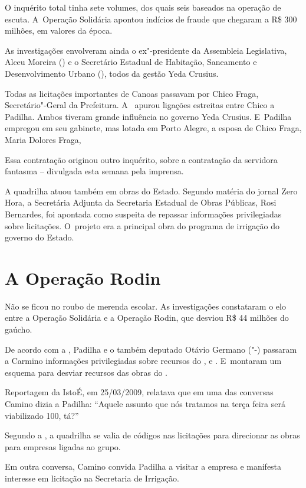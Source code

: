 O inquérito total tinha sete volumes, dos quais seis baseados na
operação de escuta. A~Operação Solidária apontou indícios de fraude que
chegaram a R\$ 300 milhões, em valores da época.

As investigações envolveram ainda o ex"-presidente da Assembleia
Legislativa, Alceu Moreira () e o Secretário Estadual de Habitação,
Saneamento e Desenvolvimento Urbano (), todos da gestão Yeda
Crusius.

Todas as licitações importantes de Canoas passavam por Chico Fraga,
Secretário"-Geral da Prefeitura. A~ apurou ligações estreitas entre
Chico a Padilha. Ambos tiveram grande influência no governo Yeda
Crusius. E~Padilha empregou em seu gabinete, mas lotada em Porto Alegre,
a esposa de Chico Fraga, Maria Dolores Fraga,

Essa contratação originou outro inquérito, sobre a contratação da
servidora fantasma -- divulgada esta semana pela imprensa.

A quadrilha atuou também em obras do Estado. Segundo matéria do jornal
Zero Hora, a Secretária Adjunta da Secretaria Estadual de Obras
Públicas, Rosi Bernardes, foi apontada como suspeita de repassar
informações privilegiadas sobre licitações. O~projeto era a principal
obra do programa de irrigação do governo do Estado.

\section{A Operação Rodin}

Não se ficou no roubo de merenda escolar. As investigações constataram o
elo entre a Operação Solidária e a Operação Rodin, que desviou R\$ 44
milhões do  gaúcho.

De acordo com a , Padilha e o também deputado Otávio Germano ("-)
passaram a Carmino informações privilegiadas sobre recursos do ,
 e . E~montaram um esquema para desviar recursos das obras do
.

Reportagem da IstoÉ, em 25/\allowbreak{}03/\allowbreak{}2009, relatava que em uma das conversas
Camino dizia a Padilha: ``Aquele assunto que nós tratamos na terça feira
será viabilizado 100, tá?''

Segundo a , a quadrilha se valia de códigos nas licitações para
direcionar as obras para empresas ligadas ao grupo.

Em outra conversa, Camino convida Padilha a visitar a empresa e
manifesta interesse em licitação na Secretaria de Irrigação.

